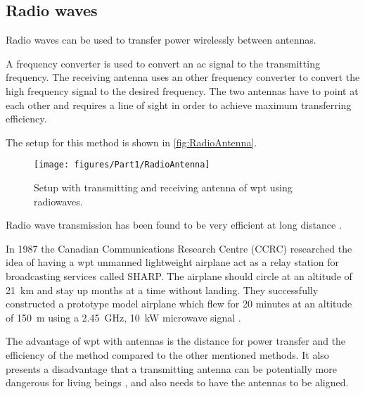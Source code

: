 \subsection{Radio waves} \label{sec:radioRadiowaves} 
Radio waves can be used to transfer power wirelessly between antennas.

A frequency converter is used to convert an \gls{ac} signal to the transmitting frequency.
The receiving antenna uses an other frequency converter to convert the high frequency signal to the desired frequency. The two antennas have to point at each other and requires a line of sight in order to achieve maximum transferring efficiency. 
 
The setup for this method is shown in \autoref{fig:RadioAntenna}. 
\begin{figure}[h]
	\centering
	\texttt{[image: figures/Part1/RadioAntenna]}
	\caption{Setup with transmitting and receiving antenna of \gls{wpt} using radiowaves.}
	\label{fig:RadioAntenna}
\end{figure}

Radio wave transmission has been found to be very efficient at long distance \citep{TechReport:WPTSheik}.%

In 1987 the Canadian Communications Research Centre (CCRC) researched the idea of having a \gls{wpt} unmanned lightweight airplane act as a relay station for broadcasting services called SHARP. The airplane should circle at an altitude of \SI{21}{\kilo\meter} and stay up months at a time without landing. They successfully constructed a prototype model airplane which flew for 20 minutes at an altitude of \SI{150}{\meter} using a \SI{2.45}{\giga\hertz}, \SI{10}{\kilo\watt} microwave signal \citep{book:shinohara,TechReport:SHARP88}.

The advantage of \gls{wpt} with antennas is the distance for power transfer and the efficiency of the method compared to the other mentioned methods. It also presents a disadvantage that a transmitting antenna can be potentially more dangerous for living beings \citep{manual:ICNIRP_GUIDELINES}, and also needs to have the antennas to be aligned.





